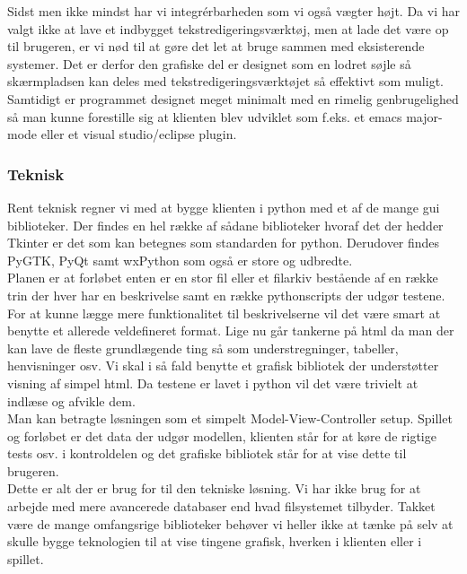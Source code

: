 \documentclass[10pt,a4paper,danish]{article}
\begin{document}
Sidst men ikke mindst har vi integrérbarheden som vi også vægter højt.
Da vi har valgt ikke at lave et indbygget tekstredigeringsværktøj, men at lade det være op til brugeren, er vi nød til at gøre det let at bruge sammen med eksisterende systemer. Det er derfor den grafiske del er designet som en lodret søjle så skærmpladsen kan deles med tekstredigeringsværktøjet så effektivt som muligt. Samtidigt er programmet designet meget minimalt med en rimelig genbrugelighed så man kunne forestille sig at klienten blev udviklet som f.eks. et emacs major-mode eller et visual studio/eclipse plugin.
\\

\paragraph{}

\subsubsection{Teknisk}
Rent teknisk regner vi med at bygge klienten i python med et af de mange gui biblioteker. Der findes en hel række af sådane biblioteker hvoraf det der hedder Tkinter er det som kan betegnes som standarden for python. Derudover findes PyGTK, PyQt samt wxPython som også er store og udbredte.
\\

Planen er at forløbet enten er en stor fil eller et filarkiv bestående af en række trin der hver har en beskrivelse samt en række pythonscripts der udgør testene. For at kunne lægge mere funktionalitet til beskrivelserne vil det være smart at benytte et allerede veldefineret format. Lige nu går tankerne på html da man der kan lave de fleste grundlægende ting så som understregninger, tabeller, henvisninger osv. Vi skal i så fald benytte et grafisk bibliotek der understøtter visning af simpel html.
Da testene er lavet i python vil det være trivielt at indlæse og afvikle dem.
\\

Man kan betragte løsningen som et simpelt Model-View-Controller setup.
Spillet og forløbet er det data der udgør modellen, klienten står for at køre de rigtige tests osv. i kontroldelen og det grafiske bibliotek står for at vise dette til brugeren.
\\

Dette er alt der er brug for til den tekniske løsning. Vi har ikke brug for at arbejde med mere avancerede databaser end hvad filsystemet tilbyder. Takket være de mange omfangsrige biblioteker behøver vi heller ikke at tænke på selv at skulle bygge teknologien til at vise tingene grafisk, hverken i klienten eller i spillet.
\end{document}
